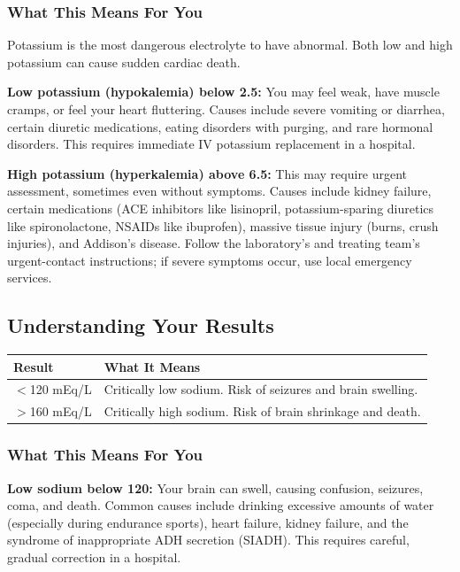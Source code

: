 \subsubsection{What This Means For You}

Potassium is the most dangerous electrolyte to have abnormal. Both low and high potassium can cause sudden cardiac death.

\textbf{Low potassium (hypokalemia) below 2.5:} You may feel weak, have muscle cramps, or feel your heart fluttering. Causes include severe vomiting or diarrhea, certain diuretic medications, eating disorders with purging, and rare hormonal disorders. This requires immediate IV potassium replacement in a hospital.

\textbf{High potassium (hyperkalemia) above 6.5:} This may require urgent assessment, sometimes even without symptoms. Causes include kidney failure, certain medications (ACE inhibitors like lisinopril, potassium-sparing diuretics like spironolactone, NSAIDs like ibuprofen), massive tissue injury (burns, crush injuries), and Addison's disease. Follow the laboratory's and treating team's urgent-contact instructions; if severe symptoms occur, use local emergency services.

\subsection{Understanding Your Results}

\begin{longtable}{@{}ll@{}}
\toprule
\textbf{Result} & \textbf{What It Means} \\
\midrule
$<$120 mEq/L & Critically low sodium. Risk of seizures and brain swelling. \\
$>$160 mEq/L & Critically high sodium. Risk of brain shrinkage and death. \\
\bottomrule
\end{longtable}

\subsubsection{What This Means For You}

\textbf{Low sodium below 120:} Your brain can swell, causing confusion, seizures, coma, and death. Common causes include drinking excessive amounts of water (especially during endurance sports), heart failure, kidney failure, and the syndrome of inappropriate ADH secretion (SIADH). This requires careful, gradual correction in a hospital.

